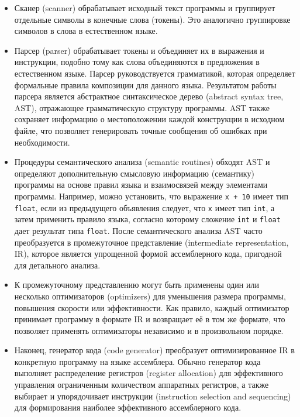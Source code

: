 \begin{itemize}
    \item Сканер (scanner) обрабатывает исходный текст программы и группирует отдельные символы в конечные слова (токены).
          Это аналогично группировке символов в слова в естественном языке.
    \item Парсер (parser) обрабатывает токены и объединяет их в выражения и инструкции, подобно тому как слова объединяются в предложения в естественном языке.
          Парсер руководствуется грамматикой, которая определяет формальные правила композиции для данного языка.
          Результатом работы парсера является абстрактное синтаксическое дерево (abstract syntax tree, AST), отражающее грамматическую структуру программы.
          AST также сохраняет информацию о местоположении каждой конструкции в исходном файле, что позволяет генерировать точные сообщения об ошибках при необходимости.
    \item Процедуры семантического анализа (semantic routines) обходят AST и определяют дополнительную смысловую информацию (семантику) программы на основе правил языка и взаимосвязей между элементами программы.
          Например, можно установить, что выражение \verb|x + 10| имеет тип \verb|float|, если из предыдущего объявления следует, что \verb|x| имеет тип \verb|int|, а затем применить правило языка, согласно которому сложение \verb|int| и \verb|float| дает результат типа \verb|float|.
          После семантического анализа AST часто преобразуется в промежуточное представление (intermediate representation, IR), которое является упрощенной формой ассемблерного кода, пригодной для детального анализа.
    \item К промежуточному представлению могут быть применены один или несколько оптимизаторов (optimizers) для уменьшения размера программы, повышения скорости или эффективности.
          Как правило, каждый оптимизатор принимает программу в формате IR и возвращает её в том же формате, что позволяет применять оптимизаторы независимо и в произвольном порядке.
    \item Наконец, генератор кода (code generator) преобразует оптимизированное IR в конкретную программу на языке ассемблера.
          Обычно генератор кода выполняет распределение регистров (register allocation) для эффективного управления ограниченным количеством аппаратных регистров, а также выбирает и упорядочивает инструкции (instruction selection and sequencing) для формирования наиболее эффективного ассемблерного кода.
\end{itemize}

